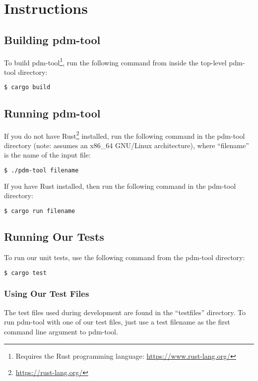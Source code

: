 \chapter{Instructions}

\section{Building pdm-tool}

To build pdm-tool\footnote{Requires the Rust programming language:
\url{https://www.rust-lang.org/}}, run the following command from inside the
top-level pdm-tool directory:

\begin{lstlisting}[language=bash,frame=single,showstringspaces=false]
$ cargo build
\end{lstlisting}

\section{Running pdm-tool}

If you do not have Rust\footnote{\url{https://rust-lang.org/}} installed,
run the following command in the
pdm-tool directory (note: assumes an x86\_64 GNU/Linux architecture), where
``filename'' is the name of the input file:

\begin{lstlisting}[language=bash,frame=single,showstringspaces=false]
$ ./pdm-tool filename
\end{lstlisting}

If you have Rust installed, then run the following command in the pdm-tool
directory:

\begin{lstlisting}[language=bash,frame=single,showstringspaces=false]
$ cargo run filename
\end{lstlisting}

\section{Running Our Tests}

To run our unit tests, use the following command from the pdm-tool
directory:

\begin{lstlisting}[language=bash,frame=single,showstringspaces=false]
$ cargo test
\end{lstlisting}

\subsection{Using Our Test Files}

The test files used during development are found in the ``testfiles''
directory. To run pdm-tool with one of our test files, just use a
test filename as the first command line argument to pdm-tool.
